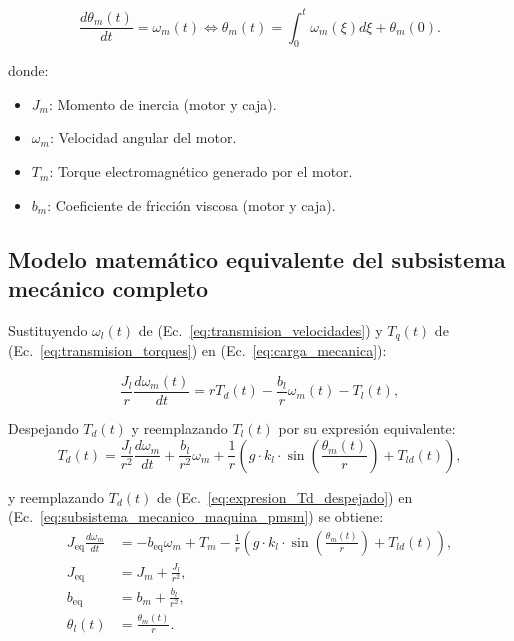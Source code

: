 \documentclass{article}
\begin{document}
\begin{equation}
    \frac{d\theta_m(t)}{dt} = \omega_m(t) \iff \theta_m(t) = \int_{0}^{t} \omega_m(\xi) d\xi + \theta_m(0).
\end{equation}

donde:
\begin{itemize}
    \item $J_m$: Momento de inercia (motor y caja).
    \item $\omega_m$: Velocidad angular del motor.
    \item $T_m$: Torque electromagnético generado por el motor.
    \item $b_m$: Coeficiente de fricción viscosa (motor y caja).
\end{itemize}


\subsection{Modelo matemático equivalente del subsistema mecánico completo}

Sustituyendo \( \omega_l(t) \) de (Ec.~\ref{eq:transmision_velocidades}) y \( T_q(t) \) de (Ec.~\ref{eq:transmision_torques}) en (Ec.~\ref{eq:carga_mecanica}):

\begin{equation}
    \frac{J_l}{r} \frac{d\omega_m(t)}{dt} = r T_d(t) - \frac{b_l}{r} \omega_m(t) - T_l(t),
\end{equation}

Despejando \( T_d(t) \) y reemplazando \( T_l(t) \) por su expresión equivalente:
\begin{equation}
\label{eq:expresion_Td_despejado}
    T_d(t) = \frac{J_l}{r^2} \frac{d\omega_m}{dt} + \frac{b_l}{r^2} \omega_m + \frac{1}{r} \left(g \cdot k_l \cdot \sin\left(\frac{\theta_m(t)}{r}\right) + T_{ld}(t)\right),
\end{equation}

y reemplazando \( T_d(t) \) de (Ec.~\ref{eq:expresion_Td_despejado}) en (Ec.~\ref{eq:subsistema_mecanico_maquina_pmsm}) se obtiene:
\begin{align}
    J_{\text{eq}} \frac{d\omega_m}{dt} &= -b_{\text{eq}} \omega_m + T_m - \frac{1}{r} \left(g \cdot k_l \cdot \sin\left(\frac{\theta_m(t)}{r}\right) + T_{ld}(t)\right), \\
    J_{\text{eq}} &= J_m + \frac{J_l}{r^2}, \\
    b_{\text{eq}} &= b_m + \frac{b_l}{r^2}, \\
    \theta_l(t) &= \frac{\theta_m(t)}{r}.
\end{align}
\end{document}
